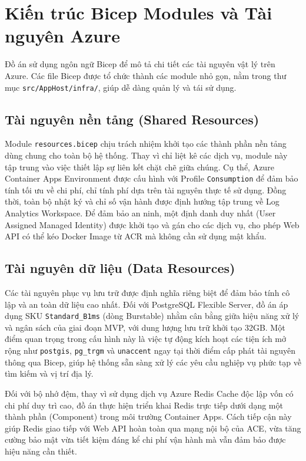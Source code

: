\documentclass[a4paper,12pt,twoside]{report}
\begin{document}
\section{Kiến trúc Bicep Modules và Tài nguyên Azure}

Đồ án sử dụng ngôn ngữ Bicep để mô tả chi tiết các tài nguyên vật lý trên Azure. Các file Bicep được tổ chức thành các module nhỏ gọn, nằm trong thư mục \texttt{src/AppHost/infra/}, giúp dễ dàng quản lý và tái sử dụng.

\subsection{Tài nguyên nền tảng (Shared Resources)}

Module \texttt{resources.bicep} chịu trách nhiệm khởi tạo các thành phần nền tảng dùng chung cho toàn bộ hệ thống. Thay vì chỉ liệt kê các dịch vụ, module này tập trung vào việc thiết lập sự liên kết chặt chẽ giữa chúng. Cụ thể, Azure Container Apps Environment được cấu hình với Profile \texttt{Consumption} để đảm bảo tính tối ưu về chi phí, chỉ tính phí dựa trên tài nguyên thực tế sử dụng. Đồng thời, toàn bộ nhật ký và chỉ số vận hành được định hướng tập trung về Log Analytics Workspace. Để đảm bảo an ninh, một định danh duy nhất (User Assigned Managed Identity) được khởi tạo và gán cho các dịch vụ, cho phép Web API có thể kéo Docker Image từ ACR mà không cần sử dụng mật khẩu.

\subsection{Tài nguyên dữ liệu (Data Resources)}

Các tài nguyên phục vụ lưu trữ được định nghĩa riêng biệt để đảm bảo tính cô lập và an toàn dữ liệu cao nhất. Đối với PostgreSQL Flexible Server, đồ án áp dụng SKU \texttt{Standard\_B1ms} (dòng Burstable) nhằm cân bằng giữa hiệu năng xử lý và ngân sách của giai đoạn MVP, với dung lượng lưu trữ khởi tạo 32GB. Một điểm quan trọng trong cấu hình này là việc tự động kích hoạt các tiện ích mở rộng như \texttt{postgis}, \texttt{pg\_trgm} và \texttt{unaccent} ngay tại thời điểm cấp phát tài nguyên thông qua Bicep, giúp hệ thống sẵn sàng xử lý các yêu cầu nghiệp vụ phức tạp về tìm kiếm và vị trí địa lý.

Đối với bộ nhớ đệm, thay vì sử dụng dịch vụ Azure Redis Cache độc lập vốn có chi phí duy trì cao, đồ án thực hiện triển khai Redis trực tiếp dưới dạng một thành phần (Component) trong môi trường Container Apps. Cách tiếp cận này giúp Redis giao tiếp với Web API hoàn toàn qua mạng nội bộ của ACE, vừa tăng cường bảo mật vừa tiết kiệm đáng kể chi phí vận hành mà vẫn đảm bảo được hiệu năng cần thiết.
\end{document}
